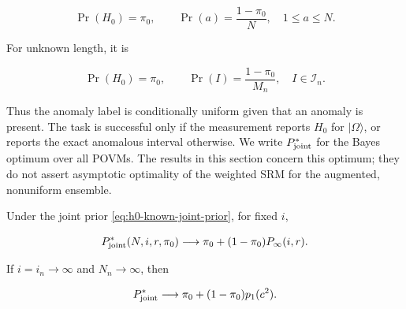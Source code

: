 \begin{equation}\label{eq:h0-known-joint-prior}
\Pr(H_0)=\pi_0,
\qquad
\Pr(a)=\frac{1-\pi_0}{N},
\quad 1\le a\le N.
\end{equation}

For unknown length, it is

\begin{equation}\label{eq:h0-unknown-joint-prior}
\Pr(H_0)=\pi_0,
\qquad
\Pr(I)=\frac{1-\pi_0}{M_n},
\quad I\in\mathcal I_n.
\end{equation}

Thus the anomaly label is conditionally uniform given that an anomaly is
present. The task is successful only if the measurement reports \(H_0\) for
\(|\Omega\rangle\), or reports the exact anomalous interval otherwise. We
write \(P_{\rm joint}^*\) for the Bayes optimum over all POVMs. The results in
this section concern this optimum; they do not assert asymptotic optimality of
the weighted SRM for the augmented, nonuniform ensemble.

\begin{theorem}\label{thm:h0-known-length}
Under the joint prior \eqref{eq:h0-known-joint-prior}, for fixed \(i\),

\begin{equation}\label{eq:h0-fixed-limit}
P_{\rm joint}^*(N,i,r,\pi_0)
\longrightarrow
\pi_0+(1-\pi_0)P_\infty(i,r).
\end{equation}

If \(i=i_n\to\infty\) and \(N_n\to\infty\), then

\begin{equation}\label{eq:h0-growing-limit}
P_{\rm joint}^*
\longrightarrow
\pi_0+(1-\pi_0)p_1(c^2).
\end{equation}
\end{theorem}

